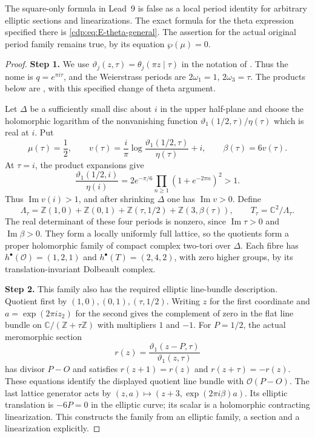 \begin{proposition}\label{cdp:st:E18}
The square-only formula in Lead~9 is false as a local period
identity for arbitrary elliptic sections and linearizations.
The exact formula for the theta expression specified there is
\eqref{cdp:eq:E-theta-general}. The assertion for the actual original
period family remains true, by its equation $\wp(\mu)=0$.
\end{proposition}

\begin{proof}
\noindent\textbf{Step 1.} We use $\vartheta_j(z,\tau)=\theta_j(\pi z\mid\tau)$ in the
notation of \cite[eqs.~20.2.1--2, 20.2.6 and 20.2.12]{DLMFTheta2026}.
Thus the nome is $q=e^{\pi i\tau}$, and the Weierstrass periods
are $2\omega_1=1$, $2\omega_3=\tau$. The products below are
\cite[eqs.~20.4.3--5 and 23.17.8]{DLMFTheta2026}, with this
specified change of theta argument.

Let $\Delta$ be a sufficiently small disc about $i$ in the upper
half-plane and choose the holomorphic logarithm of the nonvanishing
function $\vartheta_1(1/2,\tau)/\eta(\tau)$ which is real at $i$.
Put
\[
 \mu(\tau)=\frac12,\qquad
 v(\tau)=\frac{i}{\pi}
       \log\frac{\vartheta_1(1/2,\tau)}{\eta(\tau)}+i,
 \qquad \beta(\tau)=6v(\tau).
\]
At $\tau=i$, the product expansions give
\[
 \frac{\vartheta_1(1/2,i)}{\eta(i)}
 =2e^{-\pi/6}\prod_{n\geq1}(1+e^{-2\pi n})^2>1.
\]
Thus $\operatorname{Im}v(i)>1$, and after shrinking $\Delta$
one has $\operatorname{Im}v>0$. Define
\[
 \Lambda_\tau=\mathbb Z(1,0)+\mathbb Z(0,1)
 +\mathbb Z(\tau,1/2)+\mathbb Z(3,\beta(\tau)),
 \qquad T_\tau=\mathbb C^2/\Lambda_\tau.
\]
The real determinant of these four periods is nonzero, since
$\operatorname{Im}\tau>0$ and $\operatorname{Im}\beta>0$.
They form a locally uniformly full lattice, so the quotients form
a proper holomorphic family of compact complex two-tori over
$\Delta$. Each fibre has
$h^\bullet(\mathcal O)=(1,2,1)$ and
$h^\bullet(T)=(2,4,2)$, with zero higher groups, by its
translation-invariant Dolbeault complex.

\noindent\textbf{Step 2.} This family also has the required elliptic line-bundle
description. Quotient first by $(1,0),(0,1),(\tau,1/2)$.
Writing $z$ for the first coordinate and $a=\exp(2\pi iz_2)$
for the second gives the complement of zero in the flat line
bundle on $\mathbb C/(\mathbb Z+\tau\mathbb Z)$ with multipliers
$1$ and $-1$. For $P=1/2$, the actual meromorphic section
\[
 r(z)=\frac{\vartheta_1(z-P,\tau)}{\vartheta_1(z,\tau)}
\]
has divisor $P-O$ and satisfies $r(z+1)=r(z)$ and
$r(z+\tau)=-r(z)$. These equations identify the displayed
quotient line bundle with $\mathcal O(P-O)$. The last lattice
generator acts by
$(z,a)\mapsto(z+3,\exp(2\pi i\beta)a)$.
Its elliptic translation is $-6P=0$ in the elliptic curve;
its scalar is a holomorphic contracting linearization. This
constructs the family from an elliptic family, a section and a
linearization explicitly.


\end{proof}

